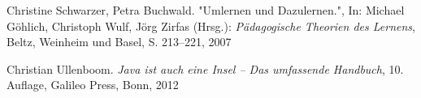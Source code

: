 \begin{thebibliography}{ABCDEF}
Christine Schwarzer, Petra Buchwald. "{Umlernen und Dazulernen}.", In: Michael Göhlich, Christoph Wulf, Jörg Zirfas (Hrsg.): \emph{Pädagogische Theorien des Lernens}, Beltz, Weinheim und Basel,  S. 213--221, 2007




Christian Ullenboom. \emph{Java ist auch eine Insel -- Das umfassende Handbuch}, 10. Auflage, Galileo Press, Bonn, 2012


\end{thebibliography}